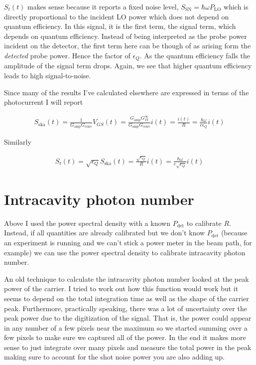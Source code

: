 \documentclass[12pt]{article}
\begin{document}
$S_t(t)$ makes sense because it reports a fixed noise level, $S_{\text{SN}} = \hbar \omega P_{\text{LO}}$ which is directly proportional to the incident LO power which does not depend on quantum efficiency. In this signal, it is the first term, the signal term, which depends on quantum efficiency. Instead of being interpreted as the probe power incident on the detector, the first term here can be though of as arising form the \textit{detected} probe power. Hence the factor of $\epsilon_Q$.  As the quantum efficiency falls the amplitude of the signal term drops. Again, we see that higher quantum efficiency leads to high signal-to-noise.

Since many of the results I've calculated elsewhere are expressed in terms of the photocurrent I will report

\begin{align}
S_{\text{ska}}(t) = \frac{1}{G_{\text{amp}}G_{\text{conv}}} V_{GS}(t) = \frac{G_{\text{amp}}G_{TI}^{\infty}}{G_{\text{amp}}G_{\text{conv}}} i(t) = \frac{i(t)}{R} = \frac{\hbar \omega}{e \epsilon_Q} i(t)
\end{align}

Similarly

\begin{align}
S_t(t) = \sqrt{\epsilon_Q} S_{\text{ska}}(t) = \frac{\sqrt{\epsilon_Q}}{R}i(t) = \frac{\hbar \omega}{e \sqrt{\epsilon_Q}} i(t)
\end{align}





\section{Intracavity photon number}

Above I used the power spectral density with a known $P_{\text{det}}$ to calibrate $R$. Instead, if all quantities are already calibrated but we don't know $P_{\text{det}}$ (because an experiment is running and we can't stick a power meter in the beam path, for example) we can use the power spectral density to calibrate intracavity photon number.

An old technique to calculate the intracavity photon number looked at the peak power of the carrier. I tried to work out how this function would work but it seems to depend on the total integration time as well as the shape of the carrier peak. Furthermore, practically speaking, there was a lot of uncertainty over the peak power due to the digitization of the signal. That is, the power could appear in any number of a few pixels near the maximum so we started summing over a few pixels to make sure we captured all of the power. In the end it makes more sense to just integrate over many pixels and measure the total power in the peak making sure to account for the shot noise power you are also adding up.
\end{document}
